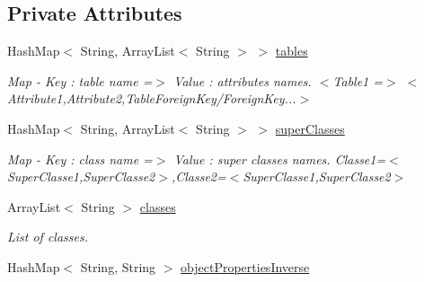 \subsection*{Private Attributes}
\begin{DoxyCompactItemize}
\item 
\hypertarget{class_classes_c_p_p_1_1_dao_generator_aac7347b462abcc6c13537cb2742db47a}{
HashMap$<$ String, ArrayList$<$ String $>$ $>$ \hyperlink{class_classes_c_p_p_1_1_dao_generator_aac7347b462abcc6c13537cb2742db47a}{tables}}
\label{class_classes_c_p_p_1_1_dao_generator_aac7347b462abcc6c13537cb2742db47a}

\begin{DoxyCompactList}\small\item\em Map -\/ Key : table name =$>$ Value : attributes names.  $<$Table1 =$>$ $<$Attribute1,Attribute2,TableForeignKey/ForeignKey...$>$ \end{DoxyCompactList}\item 
\hypertarget{class_classes_c_p_p_1_1_dao_generator_a82c17c8ceb0920fdb5550acd119418e3}{
HashMap$<$ String, ArrayList$<$ String $>$ $>$ \hyperlink{class_classes_c_p_p_1_1_dao_generator_a82c17c8ceb0920fdb5550acd119418e3}{superClasses}}
\label{class_classes_c_p_p_1_1_dao_generator_a82c17c8ceb0920fdb5550acd119418e3}

\begin{DoxyCompactList}\small\item\em Map -\/ Key : class name =$>$ Value : super classes names.  Classe1=$<$SuperClasse1,SuperClasse2$>$,Classe2=$<$SuperClasse1,SuperClasse2$>$ \end{DoxyCompactList}\item 
\hypertarget{class_classes_c_p_p_1_1_dao_generator_a1d8a1ed16c117296a86cf50de991f6c3}{
ArrayList$<$ String $>$ \hyperlink{class_classes_c_p_p_1_1_dao_generator_a1d8a1ed16c117296a86cf50de991f6c3}{classes}}
\label{class_classes_c_p_p_1_1_dao_generator_a1d8a1ed16c117296a86cf50de991f6c3}

\begin{DoxyCompactList}\small\item\em List of classes. \end{DoxyCompactList}\item 
\hypertarget{class_classes_c_p_p_1_1_dao_generator_abe833faf455358b4acfbb6094a79aac2}{
HashMap$<$ String, String $>$ \hyperlink{class_classes_c_p_p_1_1_dao_generator_abe833faf455358b4acfbb6094a79aac2}{objectPropertiesInverse}}
\label{class_classes_c_p_p_1_1_dao_generator_abe833faf455358b4acfbb6094a79aac2}


\end{DoxyCompactItemize}
